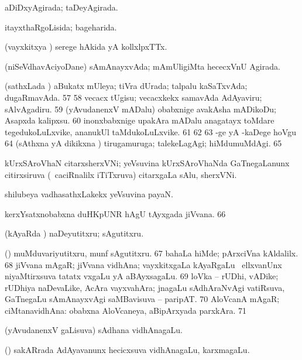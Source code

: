 {  aDiDxyAgirada; taDeyAgirada. 

  itayxthaRgoLisida; bageharida. 

  (vayxkitxya \vi) serege hAkida yA kollxlpxTTx. 

  (niSeVdhavAciyoDane) sAmAnayxvAda; mAmUligiMta hececxVnU Agirada. 

  (sathxLada \vi) aBukatx mUleya; tiVra dUrada; talpalu
kaSaTxvAda; dugaRmavAda. 
\num{57}  
\num{58}  vecacx tUgisu; vecacxkekx samavAda
AdAyaviru; sAlvAgadiru. 
\num{59}  (yAvudanenxV mADalu) obabxnige
avakAsha mADikoDu; Asapxda kalipxsu. 
\num{60}  inonxbabxnige upakAra
mADalu anagatayx toMdare tegedukoLuLxvike, ananukUl taMdukoLuLxvike. 
\num{61}  
\num{62}  
\num{63}  -ge yA -kaDege hoVgu 
\num{64}  (sAthxna yA dikikxna
\vi) tirugamuruga; talekeLagAgi; hiMdumuMdAgi. 
\num{65}  

  kUrxSAroVhaN citarxsherxVNi; yeVsuvina kUrxSAroVhaNda
GaTnegaLanunx citirxsiruva (\kanmu\ caciRnalilx iTiTxruva) citarxgaLa
sAlu, sherxVNi. 

  shilubeya vadhasathxLakekx yeVsuvina payaN. 

  kerxYsatxnobabxna duHKpUNR hAgU tAyxgada jiVvana. 
 \num{66}  

  (kAyaRda \vi) naDeyutitxru; sAgutitxru. 

  (\rUpa) muMduvariyutitxru, munf sAgutitxru. 
 \num{67}  bahaLa hiMde; pArxciVna kAldalilx. 
\num{68}  jiVvana mAgaR; jiVvana vidhAna;
vayxkitxgaLa kAyaRgaLu \mo\ ellxvanUnx niyaMtirxsuva tatatx vxgaLu yA
aBAyxsagaLu. 
\num{69}  loVka -- rUDhi, vADike; rUDhiya naDevaLike, AcAra vayxvahAra; jnagaLu sAdhAraNvAgi vatiRsuva, GaTnegaLu sAmAnayxvAgi saMBavisuva -- paripAT. 
\num{70}  AloVcanA mAgaR; ciMtanavidhAna:
 obabxna AloVcaneya, aBipArxyada
parxkAra. 
\num{71} 
 
  (yAvudanenxV gaLisuva) sAdhana vidhAnagaLu.
 
  (\birx) sakARrada AdAyavanunx hecicxsuva vidhAnagaLu, karxmagaLu.}
\eentry

